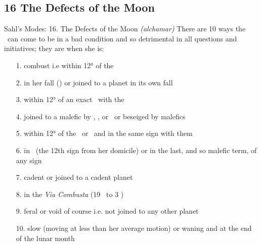 \subsection{16 The Defects of the Moon}
\begin{frame}[t]{Sahl's Modes: 16. The Defects of the Moon}
\textsl{(alchamar)} There are 10 ways the \Moon\ can come to be in a bad condition and so detrimental in all questions and initiatives; they are when she is:
\begin{enumerate}
\item[1.] combust i.e within 12° of the \Sun
\item[2.] in her fall (\Capricorn) or joined to a planet in its own fall
\item[3.] within 12° of an exact \Opposition\ with the \Sun
\item[4.] joined to a malefic by \Conjunction, \Square, or \Opposition\ or beseiged by malefics
\item[5.] within 12° of the \NorthNode\ or \SouthNode\ and in the same sign with them
\item[6.] in \Gemini\ (the 12th sign from her domicile) or in the last, and so malefic term, of any sign
\item[7.] cadent or joined to a cadent planet
\item[8.] in the \textsl{Via Combusta}  (19 \Libra\ to 3 \Scorpio)
\item[9.] feral or void of course i.e. not joined to any other planet
\item[10.] slow (moving at less than her average motion) or waning and at the end of the lunar month
\end{enumerate}
\end{frame}
